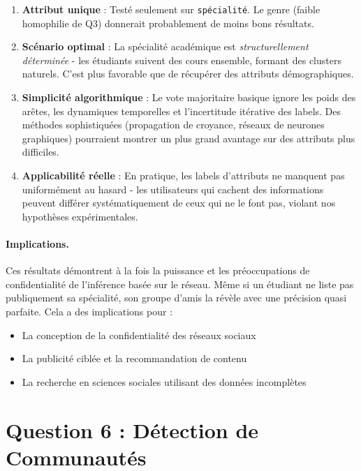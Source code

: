 \documentclass[12pt,a4paper]{article}
\begin{document}
\begin{enumerate}
    \item \textbf{Attribut unique} : Testé seulement sur \texttt{spécialité}. Le genre (faible homophilie de Q3) donnerait probablement de moins bons résultats.
    
    \item \textbf{Scénario optimal} : La spécialité académique est \textit{structurellement déterminée} - les étudiants suivent des cours ensemble, formant des clusters naturels. C'est plus favorable que de récupérer des attributs démographiques.
    
    \item \textbf{Simplicité algorithmique} : Le vote majoritaire basique ignore les poids des arêtes, les dynamiques temporelles et l'incertitude itérative des labels. Des méthodes sophistiquées (propagation de croyance, réseaux de neurones graphiques) pourraient montrer un plus grand avantage sur des attributs plus difficiles.
    
    \item \textbf{Applicabilité réelle} : En pratique, les labels d'attributs ne manquent pas uniformément au hasard - les utilisateurs qui cachent des informations peuvent différer systématiquement de ceux qui ne le font pas, violant nos hypothèses expérimentales.
\end{enumerate}

\paragraph{Implications.} Ces résultats démontrent à la fois la puissance et les préoccupations de confidentialité de l'inférence basée sur le réseau. Même si un étudiant ne liste pas publiquement sa spécialité, son groupe d'amis la révèle avec une précision quasi parfaite. Cela a des implications pour :
\begin{itemize}
    \item La conception de la confidentialité des réseaux sociaux
    \item La publicité ciblée et la recommandation de contenu
    \item La recherche en sciences sociales utilisant des données incomplètes
\end{itemize}

\section{Question 6 : Détection de Communautés}
\end{document}
